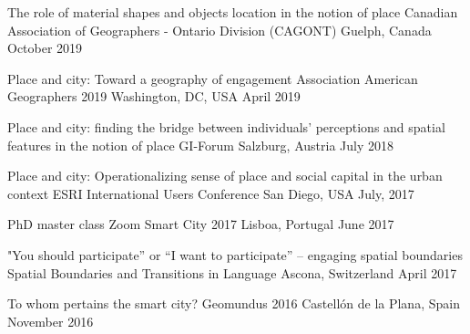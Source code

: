 
\begin{cventries}

 \cventry
    {The role of material shapes and objects location in the notion of place} %
    {Canadian Association of Geographers - Ontario Division (CAGONT)} %
    {Guelph, Canada} %
    {October 2019} %
    {}

  \cventry
    {Place and city: Toward a geography of engagement} %
    {Association American Geographers 2019} %
    {Washington, DC, USA} %
    {April 2019} %
    {}
    
  \cventry
    {Place and city: finding the bridge between individuals’ perceptions and spatial features in the notion of place} %
    {GI-Forum} %
    {Salzburg, Austria} %
    {July 2018} %
    {}

  \cventry
    {Place and city: Operationalizing sense of place and social capital in the urban context} %
    {ESRI International Users Conference} %
    {San Diego, USA} %
    {July, 2017} %
    {}

  \cventry
    {PhD master class} %
    {Zoom Smart City 2017} %
    {Lisboa, Portugal} %
    {June 2017} %
    {}
    
  \cventry
    {"You should participate” or “I want to participate” – engaging spatial boundaries} %
    {Spatial Boundaries and Transitions in Language} %
    {Ascona, Switzerland} %
    {April 2017} %
    {}

  \cventry
    {To whom pertains the smart city?} %
    {Geomundus 2016} %
    {Castellón de la Plana, Spain} %
    {November 2016} %
    {}
    
\end{cventries}

